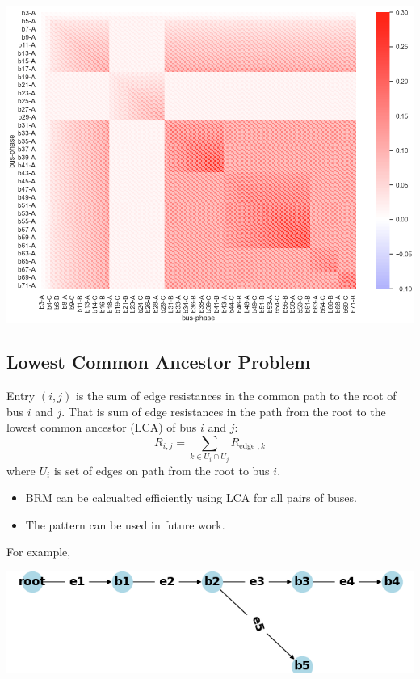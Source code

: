 \documentclass[
]{book}
\providecommand{\tightlist}{%
  \setlength{\itemsep}{0pt}\setlength{\parskip}{0pt}}
\begin{document}
\begin{center}\includegraphics{Pictures/figHeatmapBRM} \end{center}

\hypertarget{LCA}{%
\subsection*{Lowest Common Ancestor Problem}\label{LCA}}

Entry \((i, j)\) is the sum of edge resistances in the common path to the root of
bus \(i\) and \(j\). That is sum of edge resistances in the path from the root to
the lowest common ancestor (LCA) of bus \(i\) and \(j\):
\[
R_{i, j}=\sum_{k \in U_{i} \cap U_{j}} R_{\text {edge }, k}
\]
where \(U_{i}\) is set of edges on path from the root to bus \(i\).

\begin{itemize}
\tightlist
\item
  BRM can be calcualted efficiently using LCA for all pairs of buses.
\item
  The pattern can be used in future work.
\end{itemize}

For example,

\begin{center}\includegraphics[width=0.7\linewidth]{Pictures/figCaseSix} \end{center}
\end{document}

